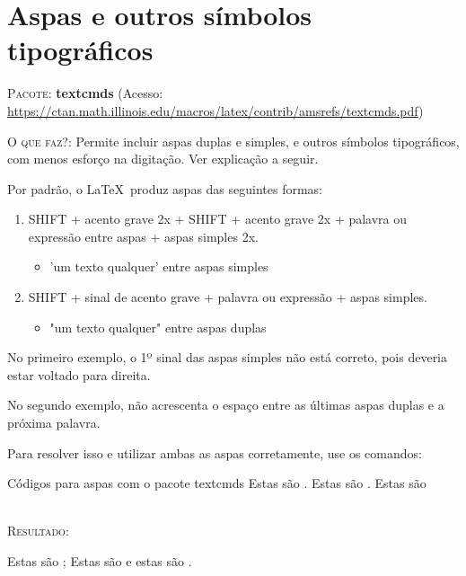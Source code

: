 \chapter{Aspas e outros símbolos tipográficos}

\textsc{Pacote:} \textbf{textcmds} (Acesso: \url{https://ctan.math.illinois.edu/macros/latex/contrib/amsrefs/textcmds.pdf})

\textsc{O que faz?}: Permite incluir aspas duplas e simples, e outros símbolos tipográficos, com menos esforço na digitação. Ver explicação a seguir.

Por padrão, o \LaTeX\ produz aspas das seguintes formas:

\begin{enumerate}
	\item SHIFT + acento grave 2x + SHIFT + acento grave 2x + palavra ou expressão entre aspas + aspas simples 2x.
	\begin{itemize}
		\item 'um texto qualquer' entre aspas simples
	\end{itemize}
	\item SHIFT + sinal de acento grave + palavra ou expressão + aspas simples.
	\begin{itemize}
		\item "um texto qualquer" entre aspas duplas
	\end{itemize}
\end{enumerate}

No primeiro exemplo, o 1º sinal das aspas simples não está correto, pois deveria estar voltado para direita.

No segundo exemplo, não acrescenta o espaço entre as últimas aspas duplas e a próxima palavra.

Para resolver isso e utilizar ambas as aspas corretamente, use os comandos:
\ \\

\begin{codex}{Códigos para aspas com o pacote textcmds}
Estas são .
Estas são .
Estas são 
\end{codex}
\ \\

\textsc{Resultado}:

Estas são ; Estas são  e estas são .
